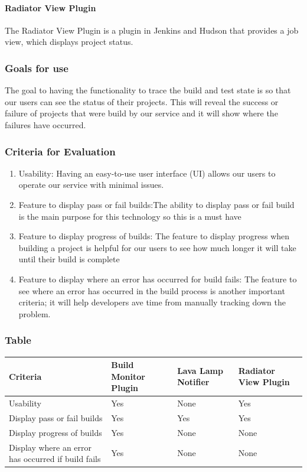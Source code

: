 \documentclass[10pt,letterpaper,onecolumn,draftclsnofoot]{IEEEtran}
\begin{document}
\paragraph{Radiator View Plugin}
The Radiator View Plugin is a plugin in Jenkins and Hudson that provides a job view, which displays project status.
\subsubsection{Goals for use}
The goal to having the functionality to trace the build and test state is so that our users can see the status of their projects.
This will reveal the success or failure of projects that were build by our service and it will show where the failures have occurred.
\subsubsection{Criteria for Evaluation}
\begin{enumerate}
  \item Usability: Having an easy-to-use user interface (UI) allows our users to operate our service with minimal issues.
  \item Feature to display pass or fail builds:The ability to display pass or fail build is  the main purpose for this technology so this is a must have
  \item Feature to display progress of builds: The feature to display progress when building a project is helpful for our users to see how much longer it will take until their build is complete
  \item Feature to display where an error has occurred for build fails: The feature to see where an error has occurred in the build process is another important criteria; it will help developers ave time from manually tracking down the problem.
\end{enumerate}
\subsubsection{Table}
\begin{center}
  \begin{tabular}{llll}
    Criteria & Build Monitor Plugin & Lava Lamp Notifier & Radiator View Plugin \\ \midrule
    Usability       & Yes & None & Yes \\ \midrule
    Display pass or fail builds           & Yes & Yes & Yes \\ \midrule
    Display progress of builds       & Yes & None & None \\ \midrule
    Display where an error has occurred if build fails  & Yes & None & None \\ \bottomrule
  \end{tabular}
\end{center}
\end{document}
